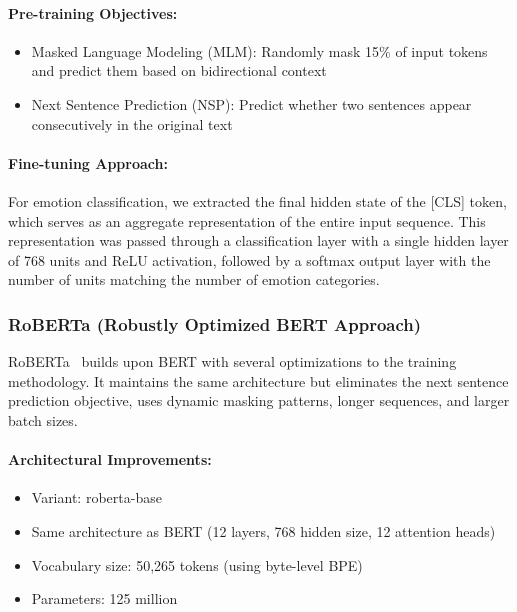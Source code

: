 \documentclass[12pt]{article}
\begin{document}
\paragraph{Pre-training Objectives:}
\begin{itemize}
    \item Masked Language Modeling (MLM): Randomly mask 15\% of input tokens and predict them based on bidirectional context
    \item Next Sentence Prediction (NSP): Predict whether two sentences appear consecutively in the original text
\end{itemize}

\paragraph{Fine-tuning Approach:}
For emotion classification, we extracted the final hidden state of the [CLS] token, which serves as an aggregate representation of the entire input sequence. This representation was passed through a classification layer with a single hidden layer of 768 units and ReLU activation, followed by a softmax output layer with the number of units matching the number of emotion categories.

\subsubsection{RoBERTa (Robustly Optimized BERT Approach)}
RoBERTa~\cite{liu2019roberta} builds upon BERT with several optimizations to the training methodology. It maintains the same architecture but eliminates the next sentence prediction objective, uses dynamic masking patterns, longer sequences, and larger batch sizes.

\paragraph{Architectural Improvements:}
\begin{itemize}
    \item Variant: roberta-base
    \item Same architecture as BERT (12 layers, 768 hidden size, 12 attention heads)
    \item Vocabulary size: 50,265 tokens (using byte-level BPE)
    \item Parameters: 125 million
\end{itemize}
\end{document}
